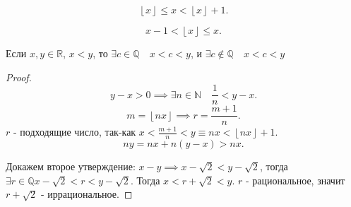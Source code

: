 \documentclass[11pt, oneside]{article}   	%
\begin{document}
    \begin{dlemma}
        \[ \left\lfloor x \right\rfloor \le x < \left\lfloor x\right\rfloor + 1 .\]        
    \end{dlemma}
    \begin{dlemma}
        \[ x-1 < \left\lfloor x\right\rfloor \le x.\] 
    \end{dlemma}
    \begin{theorem}
        Если $x, y \in \mathbb{R}$, $x<y$, то  $\exists{c \in \mathbb{Q}}\quad x<c<y$, и $\exists{c \not\in \mathbb{Q}}\quad x<c<y$
        \begin{proof}
            \[ y-x>0 \implies \exists{n \in \mathbb{N}}\quad \frac{1}{n}<y-x .\]
            \[ m = \left\lfloor nx\right\rfloor \implies r=\frac{m+1}{n} .\]
            $r$ - подходящие число, так-как  $x < \frac{m+1}{n} < y \equiv nx <  \left\lfloor nx\right\rfloor + 1$.
            \[ ny = nx+n(y-x) > nx .\]

            Докажем второе утверждение: $x-y \implies x-\sqrt{2}<y-\sqrt{2}  $, тогда $\exists{r \in \mathbb{Q}} x-\sqrt{2} < r < y-\sqrt{2}  $. Тогда $x<r+\sqrt{2}<y $. $r$ - рациональное, значит  $r+\sqrt{2} $ -  иррациональное.
        \end{proof}
    \end{theorem}
\end{document}

